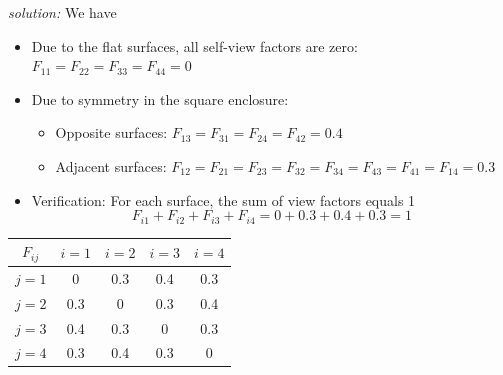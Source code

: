 \textbf{
}

\textit{solution:} We have
\begin{itemize}
    \item Due to the flat surfaces, all self-view factors are zero: $F_{11} = F_{22} = F_{33} = F_{44} = 0$
    \item Due to symmetry in the square enclosure:
    \begin{itemize}
        \item Opposite surfaces: $F_{13} = F_{31} = F_{24} = F_{42} = 0.4$
        \item Adjacent surfaces: $F_{12} = F_{21} = F_{23} = F_{32} = F_{34} = F_{43} = F_{41} = F_{14} = 0.3$
    \end{itemize}
    \item Verification: For each surface, the sum of view factors equals 1
    \[
    F_{i1} + F_{i2} + F_{i3} + F_{i4} = 0 + 0.3 + 0.4 + 0.3 = 1
    \]
\end{itemize}
%
\begin{table}[H]
    \centering
    \begin{tabular}{|c|c|c|c|c|}
    \hline$F_{i j}$ & $i=1$ & $i=2$ & $i=3$ & $i = 4$ \\
    \hline$j=1$ & 0 & 0.3 & 0.4 & 0.3 \\
    \hline$j=2$ & 0.3 & 0 & 0.3 & 0.4 \\
    \hline$j=3$ & 0.4 & 0.3 & 0 & 0.3 \\
    \hline$j=4$ & 0.3 & 0.4 & 0.3 & 0 \\
    \hline
    \end{tabular}
\end{table}





